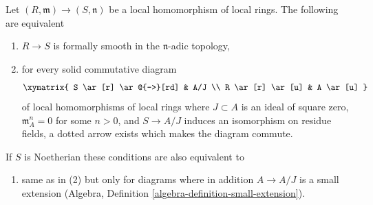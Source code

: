 \begin{lemma}
\label{lemma-fs-local}
Let $(R, \mathfrak m) \to (S, \mathfrak n)$ be a local homomorphism
of local rings. The following are equivalent
\begin{enumerate}
\item $R \to S$ is formally smooth in the $\mathfrak n$-adic topology,
\item for every solid commutative diagram
$$
\xymatrix{
S \ar[r] \ar@{-->}[rd] & A/J \\
R \ar[r] \ar[u] & A \ar[u]
}
$$
of local homomorphisms of local rings where $J \subset A$ is
an ideal of square zero, $\mathfrak m_A^n = 0$ for some $n > 0$, and
$S \to A/J$ induces an isomorphism on residue fields, a dotted
arrow exists which makes the diagram commute.
\end{enumerate}
If $S$ is Noetherian these conditions are also equivalent to
\begin{enumerate}
\item[(3)] same as in (2) but only for diagrams where in addition
$A \to A/J$ is a small extension
(Algebra, Definition \ref{algebra-definition-small-extension}).
\end{enumerate}
\end{lemma}

